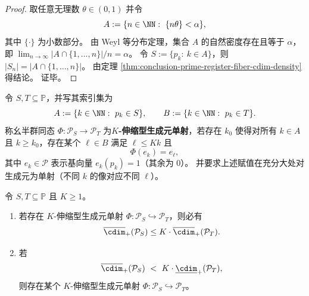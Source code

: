 \begin{proof}
取任意无理数 \(\theta\in(0,1)\) 并令
\[
A:=\{n\in\NN:\ \{n\theta\}<\alpha\},
\]
其中 \(\{\cdot\}\) 为小数部分。
由 Weyl 等分布定理，集合 \(A\) 的自然密度存在且等于 \(\alpha\)，即
\(
\lim_{n\to\infty}|A\cap\{1,\dots,n\}|/n=\alpha
\)。
令
\(
S:=\{p_k:\ k\in A\}
\)，则 \(|S_n|=|A\cap\{1,\dots,n\}|\)。
由定理 \ref{thm:conclusion-prime-register-fiber-cdim-density} 得结论。
证毕。
\end{proof}

\begin{definition}\label{def:conclusion-prime-register-K-stretch-embedding}
令 \(S,T\subseteq\mathbb P\)，并写其索引集为
\[
A:=\{k\in\NN:\ p_k\in S\},\qquad B:=\{k\in\NN:\ p_k\in T\}.
\]
称幺半群同态 \(\Phi:\mathcal P_S\to \mathcal P_T\) 为\textbf{\(K\)-伸缩型生成元单射}，若存在 \(k_0\) 使得对所有 \(k\in A\) 且 \(k\ge k_0\)，存在某个 \(\ell\in B\) 满足 \(\ell\le Kk\) 且
\[
\Phi(e_k)=e_\ell,
\]
其中 \(e_k\in\mathcal P\) 表示基向量 \(e_k(p_k)=1\)（其余为 \(0\)）。
并要求上述赋值在充分大处对生成元为单射（不同 \(k\) 的像对应不同 \(\ell\)）。
\end{definition}

\begin{theorem}\label{thm:conclusion-prime-register-K-stretch-density-criterion}
令 \(S,T\subseteq\mathbb P\) 且 \(K\ge 1\)。
\begin{enumerate}
  \item 若存在 \(K\)-伸缩型生成元单射 \(\Phi:\mathcal P_S\hookrightarrow \mathcal P_T\)，则必有
  \[
  \overline{\cdim}_+(\mathcal P_S)\le K\cdot \overline{\cdim}_+(\mathcal P_T).
  \]
  \item 若
  \[
  \overline{\cdim}_+(\mathcal P_S)\ <\ K\cdot \underline{\cdim}_+(\mathcal P_T),
  \]
  则存在某个 \(K\)-伸缩型生成元单射 \(\Phi:\mathcal P_S\hookrightarrow \mathcal P_T\)。
\end{enumerate}
\end{theorem}

